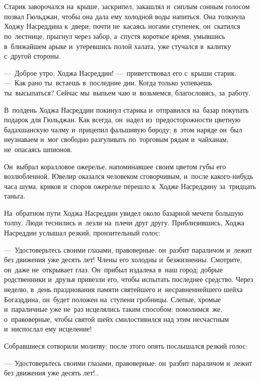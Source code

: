 \documentclass[12pt,a4paper]{book}
\begin{document}
\chapter{}

Старик заворочался на~крыше, заскрипел, закашлял и~сиплым сонным голосом позвал Гюльджан, чтобы она дала ему холодной воды напиться. Она толкнула Ходжу Насреддина к~двери; почти не~касаясь ногами ступенек, он~скатился по~лестнице, прыгнул через забор, а~спустя короткое время, умывшись в~ближайшем арыке и~утеревшись полой халата, уже стучался в~калитку с~другой стороны.

—~Доброе утро, Ходжа Насреддин! —~приветствовал его с~крыши старик. —~Как рано ты~встаешь в~последние дни. Когда только успеваешь ты~высыпаться? Сейчас мы~выпьем чаю и~возьмемся, благословясь, за~работу.

В~полдень Ходжа Насреддин покинул старика и~отправился на~базар покупать подарок для Гюльджан. Как всегда, он~надел из~предосторожности цветную бадахшанскую чалму и~прицепил фальшивую бороду; в~этом наряде он~был неузнаваем и~мог свободно разгуливать по~торговым рядам и~чайханам, не~опасаясь шпионов.

Он~выбрал коралловое ожерелье, напоминавшее своим цветом губы его возлюбленной. Ювелир оказался человеком сговорчивым, и~после какого-нибудь часа шума, криков и~споров ожерелье перешло к~Ходже Насреддину за~тридцать таньга.

На~обратном пути Ходжа Насреддин увидел около базарной мечети большую толпу. Люди теснились и~лезли на~плечи друг другу. Приблизившись, Ходжа Насреддин услышал резкий, пронзительный голос:

—~Удостоверьтесь своими глазами, правоверные: он~разбит параличом и~лежит без движения уже десять лет! Члены его холодны и~безжизненны. Смотрите, он~даже не~открывает глаз. Он~прибыл издалека в~наш город; добрые родственники и~друзья привезли его, чтобы испытать последнее средство. Через неделю, в~день празднования памяти святейшего и~несравненнейшего шейха Богаэддина, он~будет положен на~ступени гробницы. Слепые, хромые и~параличные уже не~раз исцелялись таким способом: помолимся~же, о~правоверные, чтобы святой шейх смилостивился над этим несчастным и~ниспослал ему исцеление!

Собравшиеся сотворили молитву; после этого опять послышался резкий голос:

—~Удостоверьтесь своими глазами, правоверные: он~разбит параличом и~лежит без движения уже десять лет!..
\end{document}
